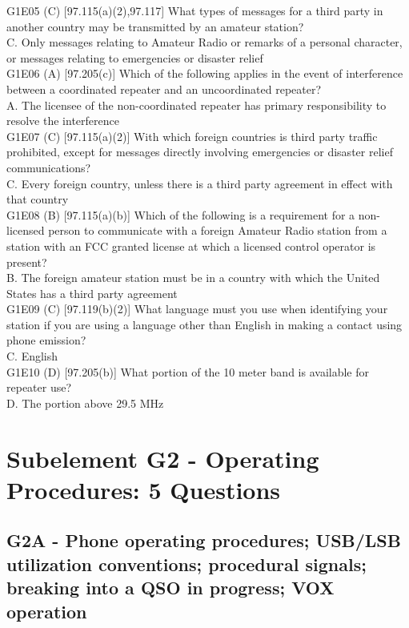 \documentclass[12pt,letterpaper]{report}
\begin{document}
G1E05 (C) [97.115(a)(2),97.117] What types of messages for a third party in another country may be transmitted by an amateur station?\\
C. Only messages relating to Amateur Radio or remarks of a personal character, or messages relating to emergencies or disaster relief\\

G1E06 (A) [97.205(c)] Which of the following applies in the event of interference between a coordinated repeater and an uncoordinated repeater?\\
A. The licensee of the non-coordinated repeater has primary responsibility to resolve the interference\\

G1E07 (C) [97.115(a)(2)] With which foreign countries is third party traffic prohibited, except for messages directly involving emergencies or disaster relief communications?\\
C. Every foreign country, unless there is a third party agreement in effect with that country\\

G1E08 (B) [97.115(a)(b)] Which of the following is a requirement for a non-licensed person to communicate with a foreign Amateur Radio station from a station with an FCC granted license at which a licensed control operator is present?\\
B. The foreign amateur station must be in a country with which the United States has a third party agreement\\

G1E09 (C) [97.119(b)(2)] What language must you use when identifying your station if you are using a language other than English in making a contact using phone emission?\\
C. English\\

G1E10 (D) [97.205(b)] What portion of the 10 meter band is available for repeater use?\\
D. The portion above 29.5 MHz\\

\chapter{Subelement G2 - Operating Procedures: 5 Questions}
\section{G2A - Phone operating procedures; USB/LSB utilization conventions; procedural signals; breaking into a QSO in progress; VOX operation}
\end{document}
